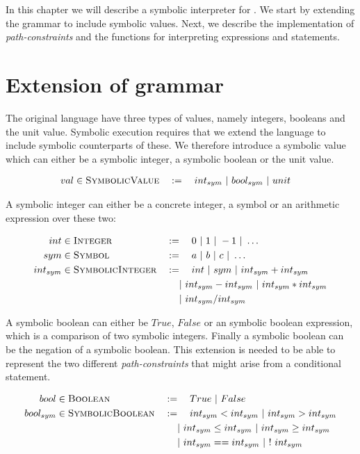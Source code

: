 In this chapter we will describe a symbolic interpreter for \explanguage. We start by extending the grammar to include symbolic values. Next, we describe the implementation of \emph{path-constraints} and the functions for interpreting expressions and statements.

\section{Extension of grammar}

The original language have three types of values, namely integers, booleans and the unit value. Symbolic execution requires that we extend the language to include symbolic counterparts of these. We therefore introduce a symbolic value which can either be a symbolic integer, a symbolic boolean or the unit value.

\begin{alignat*}{3}
	val & \in \textsc{SymbolicValue} && := \quad int_{sym} \ | \ 
	bool_{sym} \ | \  unit
\end{alignat*}



 A symbolic integer can either be a concrete integer, a symbol or an arithmetic expression over these two:



\begin{alignat*}{3}
	int & \in \textsc{Integer} && := \quad 0 \ | \  1 \ | \  -1 \ | \  \ldots\\
	sym & \in \textsc{Symbol} && := \quad a \ | \  b \ | \  c \ | \  \ldots \\	
	int_{sym} & \in \textsc{SymbolicInteger} && := \quad int \ | \  sym \ | \  int_{sym} + int_{sym} \\
	& && \quad \ | \  int_{sym} - int_{sym} \ | \  int_{sym} * int_{sym}\\
	& && \quad \ | \  int_{sym} / int_{sym}\\
\end{alignat*}

A symbolic boolean can either be $True$, $False$ or an symbolic boolean expression, which is a comparison of two symbolic integers. Finally a symbolic boolean can be the negation of a symbolic boolean. This extension is needed to be able to represent the two different \emph{path-constraints} that might arise from a conditional statement.

\begin{alignat*}{3}
	bool & \in \textsc{Boolean} && := \quad True \alt False\\
	bool_{sym} & \in \textsc{SymbolicBoolean} && := \quad int_{sym} < int_{sym} \alt int_{sym} > int_{sym}\\
	& && \quad \alt int_{sym} \leq int_{sym} \alt  int_{sym} \geq int_{sym}\\
	& && \quad \alt  int_{sym} == int_{sym} \alt  ! \ int_{sym}
\end{alignat*}



